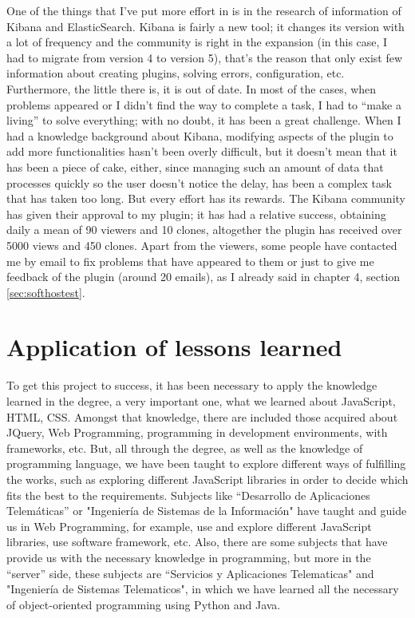 \documentclass[a4paper, 12pt]{book}
\begin{document}
One of the things that I’ve put more effort in is in the research of information of Kibana and ElasticSearch. Kibana is fairly a new tool; it changes its version with a lot of frequency and the community is right in the expansion (in this case, I had to migrate from version 4 to version 5), that’s the reason that only exist few information about creating plugins, solving errors, configuration, etc. Furthermore, the little there is, it is out of date. In most of the cases, when problems appeared or I didn’t find the way to complete a task, I had to “make a living” to solve everything; with no doubt, it has been a great challenge. When I had a knowledge background about Kibana, modifying aspects of the plugin to add more functionalities hasn’t been overly difficult, but it doesn’t mean that it has been a piece of cake, either, since managing such an amount of data that processes quickly so the user doesn’t notice the delay, has been a complex task that has taken too long.  But every effort has its rewards. The Kibana community has given their approval to my plugin; it has had a relative success, obtaining daily a mean of 90 viewers and 10 clones, altogether the plugin has received over 5000 views and 450 clones. Apart from the viewers, some people have contacted me by email to fix problems that have appeared to them or just to give me feedback of the plugin (around 20 emails), as I already said in chapter 4, section \ref{sec:softhostest}.


\section{Application of lessons learned}
\label{sec:aplication}

To get this project to success, it has been necessary to apply the knowledge learned in the degree, a very important one, what we learned about JavaScript, HTML, CSS. Amongst that knowledge, there are included those acquired about JQuery, Web Programming, programming in development environments, with frameworks, etc. But, all through the degree, as well as the knowledge of programming language, we have been taught to explore different ways of fulfilling the works, such as exploring different JavaScript libraries in order to decide which fits the best to the requirements.
Subjects like “Desarrollo de Aplicaciones Telemáticas” or "Ingeniería de Sistemas de la Información" have taught and guide us in Web Programming, for example, use and explore different JavaScript libraries, use software framework, etc. Also, there are some subjects that have provide us with the necessary knowledge in programming, but more in the “server” side, these subjects are “Servicios y Aplicaciones Telematicas" and "Ingeniería de Sistemas Telematicos", in which we have learned all the necessary of object-oriented programming using Python and Java.
\end{document}
